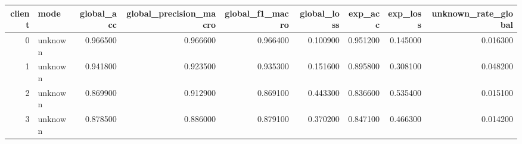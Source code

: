 \begin{tabular}{rlrrrrrrr}
\toprule
client & mode & global_acc & global_precision_macro & global_f1_macro & global_loss & exp_acc & exp_loss & unknown_rate_global \\
\midrule
0 & unknown & 0.966500 & 0.966600 & 0.966400 & 0.100900 & 0.951200 & 0.145000 & 0.016300 \\
1 & unknown & 0.941800 & 0.923500 & 0.935300 & 0.151600 & 0.895800 & 0.308100 & 0.048200 \\
2 & unknown & 0.869900 & 0.912900 & 0.869100 & 0.443300 & 0.836600 & 0.535400 & 0.015100 \\
3 & unknown & 0.878500 & 0.886000 & 0.879100 & 0.370200 & 0.847100 & 0.466300 & 0.014200 \\
\bottomrule
\end{tabular}
